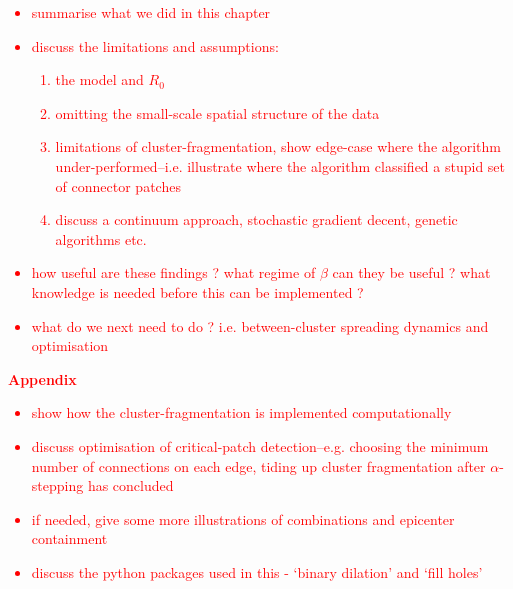 \textcolor{red}{
\begin{itemize}
    \item summarise what we did in this chapter
    \item discuss the limitations and assumptions: 
    \begin{enumerate}
        \item the model and $R_0$
        \item omitting the small-scale spatial structure of the data 
        \item limitations of cluster-fragmentation, show edge-case where the algorithm under-performed--i.e. illustrate where the algorithm classified a stupid set of connector patches
        \item discuss a continuum approach, stochastic gradient decent, genetic algorithms etc.
    \end{enumerate}
    \item how useful are these findings ? what regime of $\beta$ can they be useful ? what knowledge is needed before this can be implemented ? 
    \item what do we next need to do ? i.e. between-cluster spreading dynamics and optimisation
\end{itemize}}

\textcolor{red}{
\textbf{Appendix}
\begin{itemize}
    \item show how the cluster-fragmentation is implemented computationally
    \item discuss optimisation of critical-patch detection--e.g. choosing the minimum number of connections on each edge, tiding up cluster fragmentation after $\alpha$-stepping has concluded
    \item if needed, give some more illustrations of combinations and epicenter containment
    \item discuss the python packages used in this - `binary dilation' and `fill holes'
\end{itemize}}



